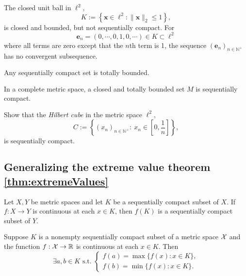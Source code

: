 \begin{exm}
  \label{exm:closedBallInEll2}
  The closed unit ball in $\ell^2$, 
  \begin{equation}
    \label{eq:closedBallInEll2}
    K:= \left\{\mathbf{x}\in \ell^2 :
      \|\mathbf{x}\|_2 \le 1 \right\}, 
  \end{equation}
  is closed and bounded, but not sequentially compact.
  For
  \begin{displaymath}
    \mathbf{e}_n = (0,\cdots,0,1,0,\cdots)\in K \subset \ell^2
  \end{displaymath}
  where all terms are zero except that the $n$th term is 1, 
  the sequence $(\mathbf{e}_n)_{n\in \mathbb{N}^+}$
  has no convergent subsequence.
\end{exm}

\begin{lem}
  \label{lem:compactnessImpliesTotalBoundedness}
  Any sequentially compact set is totally bounded. 
\end{lem}

\begin{lem}
  \label{lem:seqCompactFromTotalBoundedness}
  In a complete metric space,
  a closed and totally bounded set $M$ is sequentially compact.
\end{lem}

\begin{exc}
  \label{exm:HilbertCube}
  Show that the \emph{Hilbert cube}
  in the metric space $\ell^2$, %
  \begin{equation}
    \label{eq:HilbertCube}
    C := \left\{
      (x_n)_{n\in \mathbb{N}^+}:\ x_n\in \left[0,\frac{1}{n}\right]
      \right\}, 
  \end{equation}
  is sequentially compact.
\end{exc}


\subsection{Generalizing
  the extreme value theorem \ref{thm:extremeValues}}
\label{sec:gener-extr-value}

\begin{lem}
  \label{lem:contFuncPreservesCompactness}
  Let $X,Y$ be metric spaces and
  let $K$ be a sequentially compact subset of $X$.
  If $f:X \rightarrow Y$ is continuous at each $x\in K$,
  then $f(K)$ is a sequentially compact subset of $Y$.
\end{lem}

\begin{thm}[Weierstrass]
  \label{thm:ExtremeValueThmGeneral}
  Suppose $K$ is a nonempty sequentially compact subset
  of a metric space ${\cal X}$
  and the function $f: {\cal X}\rightarrow \mathbb{R}$ is
  continuous at each $x\in K$.
  Then
  \begin{displaymath}
    \exists a,b\in K \text{ s.t. }
    \left\{
      \begin{array}{l}
        f(a) = \max\{f(x): x\in K\},
        \\
        f(b) = \min\{f(x): x\in K\}.
      \end{array}
      \right.
  \end{displaymath}
\end{thm}

